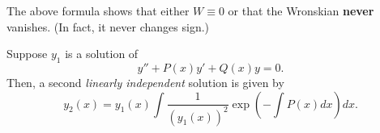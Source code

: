 \begin{cor} \label{cor:wronskian}
	The above formula shows that either $W \equiv 0$ or that the Wronskian \textbf{never} vanishes. (In fact, it never changes sign.)
\end{cor}


\begin{mdframed}[style=boxstyle, frametitle={An application}]
	Suppose $y_1$ is a solution of 
	\[y'' + P(x)y' + Q(x)y = 0.\]
	Then, a second \emph{linearly independent} solution is given by
	\[y_2(x) = y_1(x)\int \dfrac{1}{(y_1(x))^2}\exp\left(-\int P(x) dx\right) dx.\]
\end{mdframed}